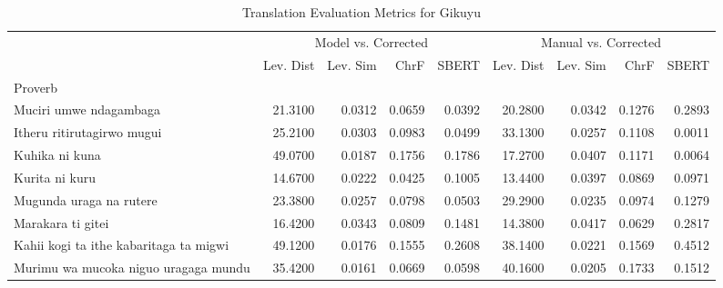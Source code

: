 \begin{table}
    \caption{Translation Evaluation Metrics for Gikuyu}
    \label{tab:gikuyu_eval}
    \begin{tabular}{lrrrrrrrr}
        \toprule                                         & \multicolumn{4}{c}{Model vs. Corrected} & \multicolumn{4}{c}{Manual vs. Corrected} \\
                                                         & Lev. Dist                               & Lev. Sim                                & ChrF   & SBERT  & Lev. Dist & Lev. Sim & ChrF   & SBERT  \\
        Proverb                                          &                                         &                                         &        &        &           &          &        &        \\
        \midrule Muciri umwe ndagambaga                  & 21.3100                                 & 0.0312                                  & 0.0659 & 0.0392 & 20.2800   & 0.0342   & 0.1276 & 0.2893 \\
        Itheru ritirutagirwo mugui                       & 25.2100                                 & 0.0303                                  & 0.0983 & 0.0499 & 33.1300   & 0.0257   & 0.1108 & 0.0011 \\
        Kuhika ni kuna                                   & 49.0700                                 & 0.0187                                  & 0.1756 & 0.1786 & 17.2700   & 0.0407   & 0.1171 & 0.0064 \\
        Kurita ni kuru                                   & 14.6700                                 & 0.0222                                  & 0.0425 & 0.1005 & 13.4400   & 0.0397   & 0.0869 & 0.0971 \\
        Mugunda uraga na rutere                          & 23.3800                                 & 0.0257                                  & 0.0798 & 0.0503 & 29.2900   & 0.0235   & 0.0974 & 0.1279 \\
        Marakara ti gitei                                & 16.4200                                 & 0.0343                                  & 0.0809 & 0.1481 & 14.3800   & 0.0417   & 0.0629 & 0.2817 \\
        Kahii kogi ta ithe kabaritaga ta migwi           & 49.1200                                 & 0.0176                                  & 0.1555 & 0.2608 & 38.1400   & 0.0221   & 0.1569 & 0.4512 \\
        Murimu wa mucoka niguo uragaga mundu             & 35.4200                                 & 0.0161                                  & 0.0669 & 0.0598 & 40.1600   & 0.0205   & 0.1733 & 0.1512 \\

\end{tabular}
\end{table}

